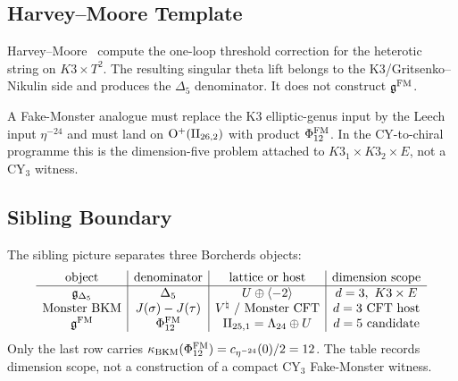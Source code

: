 \subsection{Harvey--Moore Template}
\label{wn:subsec:harvey-moore-template}

Harvey--Moore~\cite{HarveyMoore1996} compute the one-loop threshold
correction for the heterotic string on $K3\times T^2$. The resulting
singular theta lift belongs to the K3/Gritsenko--Nikulin side and
produces the $\Delta_5$ denominator. It does not construct $\mathfrak{g}^{\mathrm{FM}}$.

A Fake-Monster analogue must replace the K3 elliptic-genus input by the
Leech input $\eta^{-24}$ and must land on
$\mathrm{O}^{+}(\mathrm{II}_{26,2})$ with product $\Phi_{12}^{\mathrm{FM}}$. In the CY-to-chiral
programme this is the dimension-five problem attached to
$K3_1\times K3_2\times E$, not a CY$_3$ witness.

\subsection{Sibling Boundary}
\label{wn:subsec:fake-monster-sibling-boundary}

The sibling picture separates three Borcherds objects:
\[
\begin{array}{c|c|c|c}
\text{object} & \text{denominator} & \text{lattice or host} & \text{dimension scope}\\
\hline
\gDelta & \Delta_5 & U\oplus\langle -2\rangle & d=3,\ K3\times E\\
\text{Monster BKM} & J(\sigma)-J(\tau) & V^\natural\text{ / Monster CFT} & d=3\text{ CFT host}\\
\gFM & \PhiFM & \IIlor=\Leech\oplus U & d=5\text{ candidate}
\end{array}
\]
Only the last row carries
$\kappa_{\mathrm{BKM}}(\Phi_{12}^{\mathrm{FM}})=c_{\eta^{-24}}(0)/2=12$. The table records dimension
scope, not a construction of a compact CY$_3$ Fake-Monster witness.
